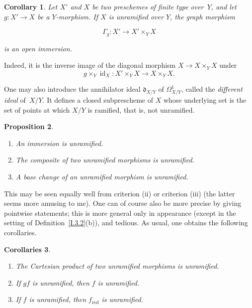 \documentclass[11pt,oneside]{amsbook}
\newtheorem{proposition}{Proposition}[section]
\newtheorem{corollary}[proposition]{Corollary}
\newtheorem{corollaries}[proposition]{Corollaries}
\theoremstyle{remark}
\theoremstyle{plain}
\numberwithin{equation}{section}
\begin{document}
\begin{corollary}
\label{I.3.4}
Let \(X'\) and \(X\) be two preschemes of finite type over~\(Y\), and let
\(g\colon X'\to X\) be a \(Y\)-morphism.  If \(X\) is unramified over
\(Y\), the graph morphism

\[
  \Gamma_g\colon X'\longrightarrow X'\times_Y X
\]

is an open immersion.\end{corollary}

Indeed, it is the inverse image of the diagonal morphism
\(X\to X\times_Y X\) under
\[
g\times_Y\operatorname{id}_{X}\colon
X'\times_Y X\longrightarrow X\times_Y X.
\]

One may also introduce the annihilator ideal
\(\mathfrak d_{X/Y}\)\label{indnot:af} of \(\Omega^1_{X/Y}\), called the
\emph{different ideal} of~\(X/Y\).  It defines a closed subprescheme of
\(X\) whose underlying set is the set of points at which \(X/Y\) is
ramified, that is, not unramified.

\begin{proposition}
\label{I.3.5}
\begin{enumerate}
\item[(i)] An immersion is unramified.
\item[(ii)] The composite of two unramified morphisms is unramified.
\item[(iii)] A base change of an unramified morphism is unramified.
\end{enumerate}
\end{proposition}

This may be seen equally well from criterion \textup{(ii)} or criterion
\textup{(iii)} (the latter seems more amusing to me).  One can of course
also be more precise by giving pointwise statements; this is more general
only in appearance (except in the setting of Definition~\ref{I.3.2}(b)), and
tedious.  As usual, one obtains the following corollaries.

\begin{corollaries}
\label{I.3.6}
\begin{enumerate}
\item[(iv)] The Cartesian product of two unramified morphisms is unramified.
\item[(v)] If \(gf\) is unramified, then \(f\) is unramified.
\item[(vi)] If \(f\) is unramified, then \(f_{\mathrm{red}}\) is
  unramified.
\end{enumerate}
\end{corollaries}
\end{document}
